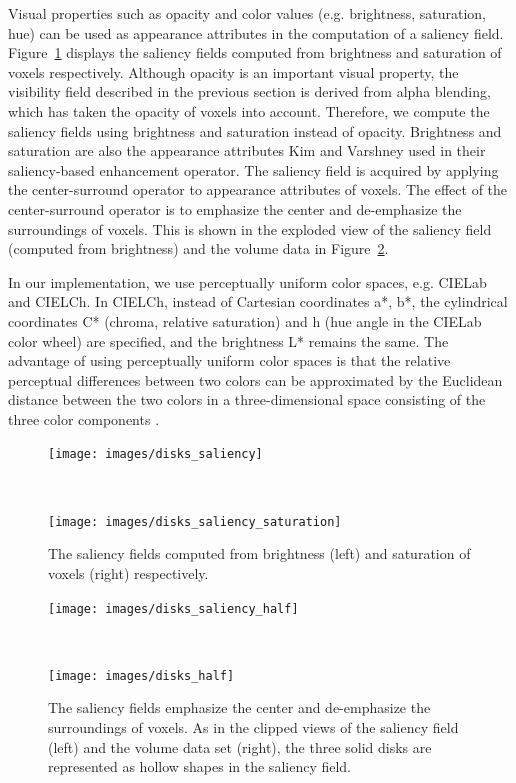 Visual properties such as opacity and color values (e.g. brightness, saturation, hue) can be used as appearance attributes in the computation of a saliency field.
Figure~\ref{fig:disks_saliency} displays the saliency fields computed from brightness and saturation of voxels respectively.
Although opacity is an important visual property, the visibility field described in the previous section is derived from alpha blending, which has taken the opacity of voxels into account. Therefore, we compute the saliency fields using brightness and saturation instead of opacity. Brightness and saturation are also the appearance attributes Kim and Varshney \cite{kim_saliency-guided_2006} used in their saliency-based enhancement operator.
The saliency field is acquired by applying the center-surround operator to appearance attributes of voxels.
The effect of the center-surround operator is to emphasize the center and de-emphasize the surroundings of voxels. This is shown in the exploded view of the saliency field (computed from brightness) and the volume data in Figure~\ref{fig:disks_saliency_half}.

In our implementation, we use perceptually uniform color spaces, e.g. CIELab and CIELCh.
In CIELCh, instead of Cartesian coordinates a*, b*, the cylindrical coordinates C* (chroma, relative saturation) and h (hue angle in the CIELab color wheel) are specified, and the brightness L* remains the same.
The advantage of using perceptually uniform color spaces is that the relative perceptual differences between two colors can be approximated by the Euclidean distance between the two colors in a three-dimensional space consisting of the three color components \cite{fairchild_color_2013}.

\begin{figure}
	\centering
	\begin{minipage}{.15\textwidth}
		\texttt{[image: images/disks\_saliency]}
	\end{minipage}~
	\begin{minipage}{.15\textwidth}
		\texttt{[image: images/disks\_saliency\_saturation]}
	\end{minipage}
	\caption{The saliency fields computed from brightness (left) and saturation of voxels (right) respectively.}
	\label{fig:disks_saliency}
\end{figure}

\begin{figure}
	\centering
	\begin{minipage}{.15\textwidth}
		\texttt{[image: images/disks\_saliency\_half]}
	\end{minipage}~
	\begin{minipage}{.15\textwidth}
		\texttt{[image: images/disks\_half]}
	\end{minipage}
	\caption{The saliency fields emphasize the center and de-emphasize the surroundings of voxels. As in the clipped views of the saliency field (left) and the volume data set (right), the three solid disks are represented as hollow shapes in the saliency field.}
	\label{fig:disks_saliency_half}
\end{figure}

